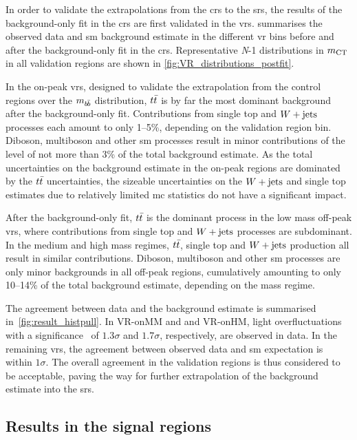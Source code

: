 

In order to validate the extrapolations from the \glspl{cr} to the \glspl{sr}, the results of the background-only fit in the \glspl{cr} are first validated in the \glspl{vr}.
 summarises the observed data and \gls{sm} background estimate in the different \gls{vr} bins before and after the background-only fit in the \glspl{cr}.
Representative \textit{N}-1 distributions in $m_{\textrm{CT}}$ in all validation regions are shown in \cref{fig:VR_distributions_postfit}.

In the on-peak \glspl{vr}, designed to validate the extrapolation from the control regions over the $m_{b\hspace{-0.06em}\bar{b}}$ distribution, $t\bar{t}$ is by far the most dominant background after the background-only fit.
Contributions from single top and $W+\mathrm{jets}$ processes each amount to only 1--5\%, depending on the validation region bin.
Diboson, multiboson and other \gls{sm} processes result in minor contributions of the level of not more than 3\% of the total background estimate.
As the total uncertainties on the background estimate in the on-peak regions are dominated by the $t\bar{t}$ uncertainties, the sizeable uncertainties on the $W+\mathrm{jets}$ and single top estimates due to relatively limited \gls{mc} statistics do not have a significant impact.

After the background-only fit, $t\bar{t}$ is the dominant process in the low mass off-peak \glspl{vr}, where contributions from single top and $W+\mathrm{jets}$ processes are subdominant.
In the medium and high mass regimes, $t\bar{t}$, single top and $W+\mathrm{jets}$ production all result in similar contributions.
Diboson, multiboson and other \gls{sm} processes are only minor backgrounds in all off-peak regions, cumulatively amounting to only 10--14\% of the total background estimate, depending on the mass regime.

The agreement between data and the background estimate is summarised in~\cref{fig:result_histpull}.
In \mbox{VR-onMM} and and \mbox{VR-onHM}, light overfluctuations with a significance~\cite{Cousins:2007bmb} of $1.3\sigma$ and $1.7\sigma$, respectively, are observed in data.
In the remaining \glspl{vr}, the agreement between observed data and \gls{sm} expectation is within $1\sigma$.
The overall agreement in the validation regions is thus considered to be acceptable, paving the way for further extrapolation of the background estimate into the \glspl{sr}.

\subsection{Results in the signal regions}


